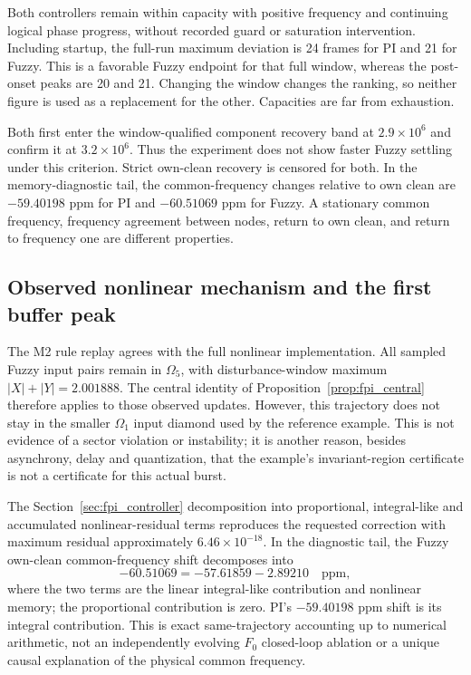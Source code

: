 Both controllers remain within capacity with positive frequency and
continuing logical phase progress, without recorded guard or saturation
intervention. Including startup, the full-run maximum deviation is
24 frames for PI and 21 for Fuzzy. This is a favorable Fuzzy endpoint
for that full window, whereas the post-onset peaks are 20 and 21.
Changing the window changes the ranking, so neither figure is used as
a replacement for the other. Capacities are far from exhaustion.

Both first enter the window-qualified component recovery band at
$2.9\times10^6$ and confirm it at $3.2\times10^6$. Thus the experiment
does not show faster Fuzzy settling under this criterion. Strict
own-clean recovery is censored for both. In the memory-diagnostic
tail, the common-frequency changes relative to own clean are
$-59.40198$ ppm for PI and $-60.51069$ ppm for Fuzzy. A stationary
common frequency, frequency agreement between nodes, return to own
clean, and return to frequency one are different properties.

\subsection{Observed nonlinear mechanism and the first buffer peak}
\label{subsec:eval_mechanism}

The M2 rule replay agrees with the full nonlinear implementation.
All sampled Fuzzy input pairs remain in $\Omega_5$, with disturbance-window
maximum $|X|+|Y|=2.001888$. The central identity of
Proposition~\ref{prop:fpi_central} therefore applies to those observed
updates. However, this trajectory does not stay in the smaller
$\Omega_1$ input diamond used by the reference example. This is not
evidence of a sector violation or instability; it is another reason,
besides asynchrony, delay and quantization, that the example's
invariant-region certificate is not a certificate for this actual burst.

The Section~\ref{sec:fpi_controller} decomposition into proportional,
integral-like and accumulated nonlinear-residual terms reproduces the
requested correction with maximum residual approximately
$6.46\times10^{-18}$. In the diagnostic tail, the Fuzzy own-clean
common-frequency shift decomposes into
\begin{equation}
 -60.51069=-57.61859-2.89210\quad\mathrm{ppm},
 \label{eq:eval_memory_accounting}
\end{equation}
where the two terms are the linear integral-like contribution and
nonlinear memory; the proportional contribution is zero. PI's
$-59.40198$ ppm shift is its integral contribution. This is exact
same-trajectory accounting up to numerical arithmetic, not an
independently evolving $F_0$ closed-loop ablation or a unique causal
explanation of the physical common frequency.

